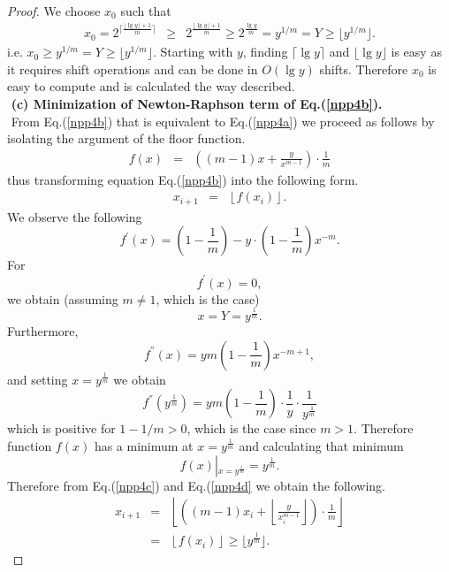 \documentclass[11pt]{article}
\newcommand{\ceil}[1]{\lceil #1 \rceil}
\newcommand{\floor}[1]{\lfloor #1 \rfloor}
\begin{document}
\begin{proof}
We choose $x_0$ such that
\begin{eqnarray}
\label{npp5}
 x_0 =      2^{\ceil{  \frac{\floor{\lg{y}}+1}{m} }  }
     &\geq& 2^{        \frac{\floor{\lg{y}}+1}{m}    }
      \geq  2^{        \frac{\lg{y}}{m}              }
       =    y^{1/m} = Y \geq \floor{y^{1/m}}.
\end{eqnarray}
i.e. $ x_0 \geq y^{1/m} = Y \geq \floor{y^{1/m}}$.
Starting with $y$, finding $\ceil{\lg{y}}$ and $\floor{\lg{y}}$
is easy as it requires shift operations and can be done in
$O(\lg{y})$ shifts.  Therefore $x_0$ is easy to compute
and is calculated the way described.
%
%
%
%
$ $ \\ $ $
{\bf (c) Minimization of Newton-Raphson term of Eq.(\ref{npp4b}).}
$ $ \\ $ $
From Eq.(\ref{npp4b}) that is equivalent to Eq.(\ref{npp4a}) 
we proceed as follows by isolating the argument of the floor
function.
\begin{eqnarray}
 f(x)
&=&
\label{npp4c}
     \left( (m-1) x +   \frac{y}{x^{m-1}}
     \right) \cdot  \frac{1}{m}
\end{eqnarray}
thus transforming equation Eq.(\ref{npp4b}) into the following
form.
\begin{eqnarray}
x_{i+1}
&=&
\label{npp4d}
  \left\lfloor
   f(x_i )
  \right\rfloor .
\end{eqnarray}
We observe the following
\[
 f^\prime (x) = \left( 1 - \frac{1}{m} \right)
                -
                y \cdot \left(  1 - \frac{1}{m} \right) x^{-m} .
\]
For
\[
f^\prime (x) = 0 ,
\]
we obtain (assuming $m \neq 1$, which is the case)
\[
  x= Y= y^{\frac{1}{m}} .
\]
Furthermore,
\[
f^{''} (x) = y m \left(  1 - \frac{1}{m} \right) x^{-m+1},
\]
and setting $  x= y^{\frac{1}{m}}$ we
obtain
\[
f^{''} (y^{\frac{1}{m}}) =
    y m \left(  1 - \frac{1}{m} \right) \cdot \frac{1}{y}
                    \cdot \frac{1}{y^{\frac{1}{m}}}
\]
which is positive for $1-1/m>0$, which is the case
since $m>1$.
Therefore function $f(x)$ has a minimum at
$x= y^{\frac{1}{m}}$
and calculating that minimum
\[
f(x)\left|_{x= y^{\frac{1}{m}}} \right. = y^{\frac{1}{m}} .
\]
Therefore from Eq.(\ref{npp4c}) and Eq.(\ref{npp4d}
we obtain the following.
\begin{eqnarray}
x_{i+1}
&=&
  \left\lfloor
     \left( (m-1) x_i +   \left\lfloor
                          \frac{y}{x_i^{m-1}}
                          \right\rfloor
     \right) \cdot  \frac{1}{m}
  \right\rfloor \nonumber \\
&=&
\label{npp5a}
  \left\lfloor
    f(x_i )
  \right\rfloor  \geq \floor{ y^{\frac{1}{m}} }.
\end{eqnarray}


\end{proof}
\end{document}
